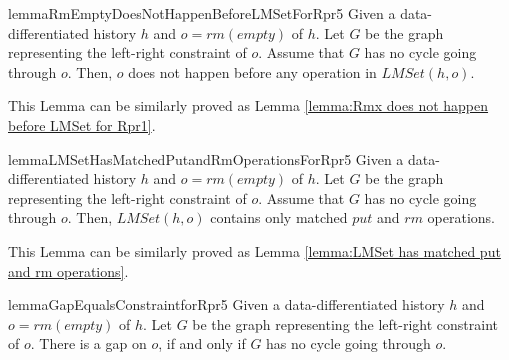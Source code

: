 \begin{restatable}{lemma}{RmEmptyDoesNotHappenBeforeLMSetForRpr5}
\label{lemma:RmEmpty does not happen before LMSet for Rpr5}
Given a data-differentiated history $h$ and $o = \textit{rm}(\textit{empty})$ of $h$. Let $G$ be the graph representing the left-right constraint of $o$. Assume that $G$ has no cycle going through $o$. Then, $o$ does not happen before any operation in $\textit{LMSet}(h,o)$.
\end{restatable}

This Lemma can be similarly proved as Lemma \ref{lemma:Rmx does not happen before LMSet for Rpr1}.


\begin{restatable}{lemma}{LMSetHasMatchedPutandRmOperationsForRpr5}
\label{lemma:LMSet has matched put and rm operations for Rpr5}
Given a data-differentiated history $h$ and $o = \textit{rm}(\textit{empty})$ of $h$. Let $G$ be the graph representing the left-right constraint of $o$. Assume that $G$ has no cycle going through $o$. Then, $\textit{LMSet}(h,o)$ contains only matched $\textit{put}$ and $\textit{rm}$ operations.
\end{restatable}

This Lemma can be similarly proved as Lemma \ref{lemma:LMSet has matched put and rm operations}.


\begin{restatable}{lemma}{GapEqualsConstraintforRpr5}
\label{lemma:Gap Equals Constraint for Rpr5}
Given a data-differentiated history $h$ and $o = \textit{rm}(\textit{empty})$ of $h$. Let $G$ be the graph representing the left-right constraint of $o$. There is a gap on $o$, if and only if $G$ has no cycle going through $o$.
\end{restatable}

